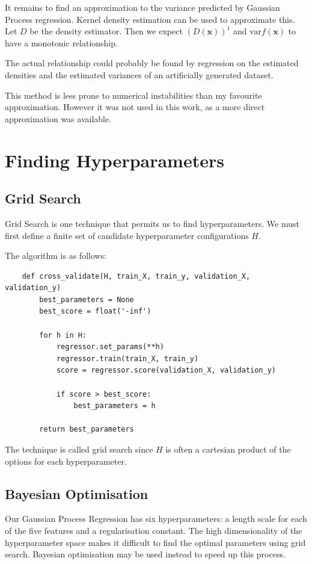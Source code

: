 \documentclass[11pt,twoside]{report}
\newcommand\bx{\mathbf{x}}
\newcommand\var{\mathrm{var}}
\begin{document}
It remains to find an approximation to the variance predicted by Gaussian Process regression. Kernel density estimation can be used to approximate this. Let $D$ be the density estimator. Then we expect $\left(D(\bx)\right)^1$ and $\var f(\bx)$ to have a monotonic relationship.

The actual relationship could probably be found by regression on the estimated densities and the estimated variances of an artificially generated dataset.

This method is less prone to numerical instabilities than my favourite approximation. However it was not used in this work, as a more direct approximation was available.

\section{Finding Hyperparameters}

  \subsection{Grid Search}

  Grid Search is one technique that permits us to find hyperparameters. We must first define a finite set of candidate hyperparameter configurations $H$.

  The algorithm is as follows:
  \begin{verbatim}
    def cross_validate(H, train_X, train_y, validation_X, validation_y)
        best_parameters = None
        best_score = float('-inf')

        for h in H:
            regressor.set_params(**h)
            regressor.train(train_X, train_y)
            score = regressor.score(validation_X, validation_y)

            if score > best_score:
                best_parameters = h

        return best_parameters
  \end{verbatim}

  The technique is called grid search since $H$ is often a cartesian product of the options for each hyperparameter.

  \subsection{Bayesian Optimisation}
  Our Gaussian Process Regression has six hyperparameters: a length scale for each of the five features and a regularisation constant. The high dimensionality of the hyperparameter space makes it difficult to find the optimal parameters using grid search. Bayesian optimisation may be used instead to speed up this process.
\end{document}
